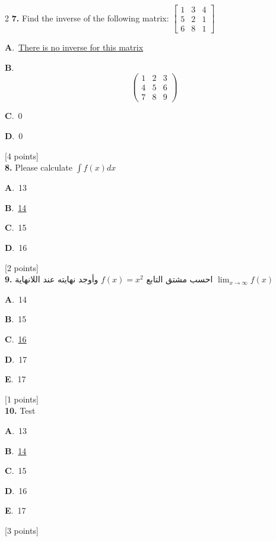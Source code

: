 \documentclass[12pt]{article}
\newcommand{\choice}[3]{%
  \noindent\textbf{#1}.~#2\hfill#3\par\vspace{0.25em}
}
\begin{document}
\begin{multicols}{2}
\noindent \textbf{\textenglish{7.}} {\textenglish{Find the inverse of the following matrix: }}\(\begin{bmatrix} 1 & 3 & 4 \\ 5 & 2 & 1 \\ 6 & 8 & 1 \end{bmatrix}\)

\noindent\choice{A}{\underline{{\textenglish{There is no inverse for this matrix}}}}{}
\noindent\choice{B}{\[\begin{pmatrix} 1 & 2 & 3 \\ 4 & 5 & 6 \\ 7 & 8 & 9  \end{pmatrix}\]}{}
\noindent\choice{C}{{\textenglish{0}}}{}
\noindent\choice{D}{{\textenglish{0}}}{}
\hfill {\textenglish{[4 points]}}\\[0.5em]

\noindent \textbf{\textenglish{8.}} {\textenglish{Please calculate }}\(\int f(x)dx\)

\noindent\choice{A}{{\textenglish{13}}}{}
\noindent\choice{B}{\underline{{\textenglish{14}}}}{}
\noindent\choice{C}{{\textenglish{15}}}{}
\noindent\choice{D}{{\textenglish{16}}}{}
\hfill {\textenglish{[2 points]}}\\[0.5em]

\noindent \textbf{\textenglish{9.}} {\textarabic{احسب مشتق التابع }}\( f(x) = x^2\){\textarabic{ وأوجد نهايته عند اللانهاية }}\(\lim_{x \to \infty}f(x)\)

\noindent\choice{A}{{\textenglish{14}}}{}
\noindent\choice{B}{{\textenglish{15}}}{}
\noindent\choice{C}{\underline{{\textenglish{16}}}}{}
\noindent\choice{D}{{\textenglish{17}}}{}
\noindent\choice{E}{{\textenglish{17}}}{}
\hfill {\textenglish{[1 points]}}\\[0.5em]

\noindent \textbf{\textenglish{10.}} {\textenglish{Test}}

\noindent\choice{A}{{\textenglish{13}}}{}
\noindent\choice{B}{\underline{{\textenglish{14}}}}{}
\noindent\choice{C}{{\textenglish{15}}}{}
\noindent\choice{D}{{\textenglish{16}}}{}
\noindent\choice{E}{{\textenglish{17}}}{}
\hfill {\textenglish{[3 points]}}\\[0.5em]


\end{multicols}
\end{document}
